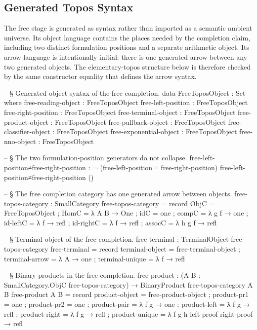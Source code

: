 \documentclass[11pt]{article}
\begin{document}
\subsection{Generated Topos Syntax}

The free stage is generated as syntax rather than imported as a semantic
ambient universe.  Its object language contains the places needed by the
completion claim, including two distinct formulation positions and a
separate arithmetic object.  Its arrow language is intentionally initial:
there is one generated arrow between any two generated objects.  The
elementary-topos structure below is therefore checked by the same
constructor equality that defines the arrow syntax.

\begin{code}

-- § Generated object syntax of the free completion.
data FreeToposObject : Set where
  free-reading-object     : FreeToposObject
  free-left-position      : FreeToposObject
  free-right-position     : FreeToposObject
  free-terminal-object    : FreeToposObject
  free-product-object     : FreeToposObject
  free-pullback-object    : FreeToposObject
  free-classifier-object  : FreeToposObject
  free-exponential-object : FreeToposObject
  free-nno-object         : FreeToposObject

-- § The two formulation-position generators do not collapse.
free-left-position≠free-right-position :
  ¬ (free-left-position ≡ free-right-position)
free-left-position≠free-right-position ()

-- § The free completion category has one generated arrow between objects.
free-topos-category : SmallCategory
free-topos-category = record
  { ObjC      = FreeToposObject
  ; HomC      = λ A B → One
  ; idC       = one
  ; compC     = λ g f → one
  ; id-leftC  = λ f → refl
  ; id-rightC = λ f → refl
  ; assocC    = λ h g f → refl
  }

-- § Terminal object of the free completion.
free-terminal : TerminalObject free-topos-category
free-terminal = record
  { terminal-object = free-terminal-object
  ; terminal-arrow  = λ A → one
  ; terminal-unique = λ f → refl
  }

-- § Binary products in the free completion.
free-product :
  (A B : SmallCategory.ObjC free-topos-category) →
  BinaryProduct free-topos-category A B
free-product A B = record
  { product-object = free-product-object
  ; product-pr1    = one
  ; product-pr2    = one
  ; product-pair   = λ f g → one
  ; product-left   = λ f g → refl
  ; product-right  = λ f g → refl
  ; product-unique = λ f g h left-proof right-proof → refl
  }


\end{code}
\end{document}
